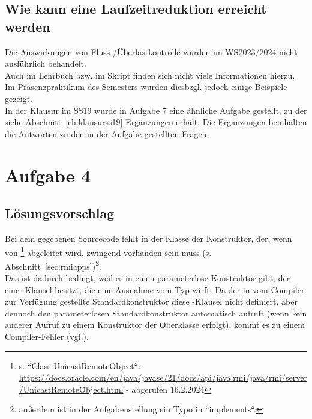 \subsection*{Wie kann eine Laufzeitreduktion erreicht werden}

\begin{tcolorbox}[colback=red!20,color=white,title=Anmerkung]
    Die Auswirkungen von Fluss-/Überlastkontrolle wurden im WS2023/2024 nicht ausführlich behandelt.\\
    Auch im Lehrbuch bzw. im Skript finden sich nicht viele Informationen hierzu.\\
    Im Präsenzpraktikum des Semesters wurden diesbzgl. jedoch einige Beispiele gezeigt.\\
    In der Klausur im SS19 wurde in Aufgabe 7 eine ähnliche Aufgabe gestellt, zu der siehe Abschnitt~\ref{ch:klausurss19} Ergänzungen erhält.
    Die Ergänzungen beinhalten die Antworten zu den in der Aufgabe gestellten Fragen.\\
\end{tcolorbox}



\section{Aufgabe 4}
\subsection{Lösungsvorschlag}

Bei dem gegebenen Sourcecode fehlt in der Klasse  der Konstruktor, der, wenn von \footnote{
s. ``Class UnicastRemoteObject``: \url{https://docs.oracle.com/en/java/javase/21/docs/api/java.rmi/java/rmi/server/UnicastRemoteObject.html} - abgerufen 16.2.2024
} abgeleitet wird, zwingend vorhanden sein muss (s. Abschnitt~\ref{sec:rmiapps})\footnote{
außerdem ist in der Aufgabenstellung ein Typo in ``implements``.
}.\\
Das ist dadurch bedingt, weil es in  einen parameterlose Konstruktor gibt, der eine -Klausel besitzt, die eine Ausnahme vom Typ  wirft.
Da der in  vom Compiler zur Verfügung gestellte Standardkonstruktor diese -Klausel nicht definiert, aber dennoch den parameterlosen Standardkonstruktor automatisch aufruft (wenn kein anderer Aufruf zu einem Konstruktor der Oberklasse erfolgt), kommt es zu einem Compiler-Fehler (vgl.\cite[313]{Oec22}).


